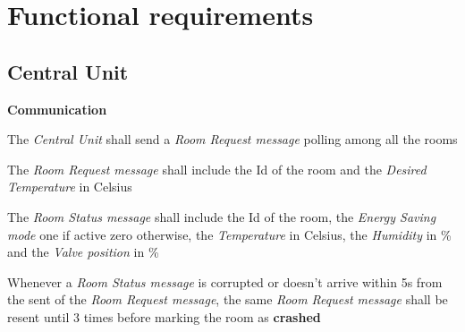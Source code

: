 \section{Functional requirements}
	\subsection{Central Unit}
		\begin{req_enum}
			\item \textbf{Communication}
				\begin{req_enum}[label*=\arabic*.]
					\item The \textit{Central Unit} shall send a \textit{Room Request message} polling among all the rooms
					\item The \textit{Room Request message} shall include the Id of the room and the \textit{Desired Temperature} in Celsius\degree
					\item The \textit{Room Status message} shall include the Id of the room, the \textit{Energy Saving mode} one if active zero otherwise, the \textit{Temperature} in Celsius\degree, the \textit{Humidity} in \% and the \textit{Valve position} in \%
					\item Whenever a \textit{Room Status message} is corrupted or doesn't arrive within 5s from the sent of the \textit{Room Request message}, the same \textit{Room Request message} shall be resent until 3 times before marking the room as \textbf{crashed}
				\end{req_enum}
		\end{req_enum}



